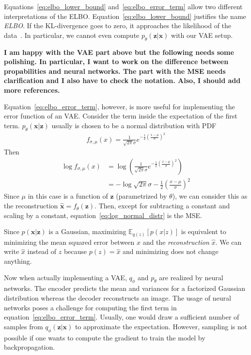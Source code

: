 Equations~\ref{eq:elbo_lower_bound} and~\ref{eq:elbo_error_term} allow two different interpretations of the \ac{ELBO}.
Equation~\ref{eq:elbo_lower_bound} justifies the name \textit{\acl{ELBO}}.
If the \ac{KL-divergence} goes to zero, it approaches the likelihood of the data~\citep[p. 18]{kingma2019introduction}.
In particular, we cannot even compute $p_\theta(\mathbf{z}|\mathbf{x})$ with our \ac{VAE} setup.

\textbf{I am happy with the VAE part above but the following needs some polishing.
In particular, I want to work on the difference between propabilities and neural networks.
The part with the MSE needs clarification and I also have to check the notation.
Also, I should add more references.}

Equation~\ref{eq:elbo_error_term}, however, is more useful for implementing the error function of an \ac{VAE}.
Consider the term inside the expectation of the first term.
$p_\theta(\mathbf{x}|\mathbf{z})$ usually is chosen to be a normal distribution with \ac{PDF}
\begin{align}
    f_{\sigma,\mu}(x) = \frac{1}{\sqrt{2\pi}\sigma}e^{-\frac{1}{2}\left( \frac{x-\mu}{\sigma} \right)^2}
\end{align}
Then
\begin{align}
    \log f_{\sigma,\mu}(x) &= \log \left( \frac{1}{\sqrt{2\pi}\sigma}e^{-\frac{1}{2}\left( \frac{x-\mu}{\sigma} \right)^2} \right)\\
    &= - \log \sqrt{2\pi}\sigma -\frac{1}{2}\left( \frac{x-\mu}{\sigma} \right)^2 \label{eq:log_normal_distr}
\end{align}
Since $\mu$ in this case is a function of $\mathbf{z}$ (parametrized by $\theta$), we can consider this as the reconstruction $\hat{\mathbf{x}} = f_\theta(\mathbf{z})$.
Then, except for subtracting a constant and scaling by a constant, equation~\ref{eq:log_normal_distr} is the \ac{MSE}.

Since $p(\mathbf{x}|\mathbf{z})$ is a Gaussian, maximizing $\mathbb{E}_{q(z)} \left[ p(x|z) \right]$ is equivalent to minimizing the mean squared error between $x$ and the \textit{reconstruction} $\hat{x}$.
We can write $\hat{x}$ instead of $z$ because $p(z) = \hat{x}$ and minimizing does not change anything.

Now when actually implementing a \ac{VAE}, $q_\phi$ and $p_\theta$ are realized by neural networks.
The encoder predicts the mean and variances for a factorized Gaussian distribution whereas the decoder reconstructs an image.
The usage of neural networks poses a challenge for computing the first term in equation~\ref{eq:elbo_error_term}.
Usually, one would draw a sufficient number of samples from $q_\phi(\mathbf{z}|\mathbf{x})$ to approximate the expectation.
However, sampling is not possible if one wants to compute the gradient to train the model by backpropagation.

